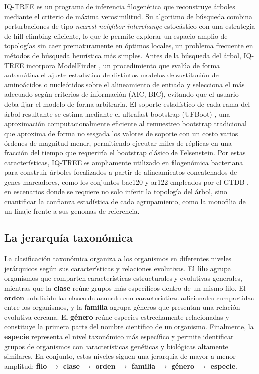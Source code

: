 IQ-TREE \cite{wong2026iqtree3} es un programa de inferencia filogenética que reconstruye árboles mediante el criterio de máxima verosimilitud. Su algoritmo de búsqueda combina perturbaciones de tipo \textit{nearest neighbor interchange} estocástico con una estrategia de hill-climbing eficiente, lo que le permite explorar un espacio amplio de topologías sin caer prematuramente en óptimos locales, un problema frecuente en métodos de búsqueda heurística más simples. Antes de la búsqueda del árbol, IQ-TREE incorpora ModelFinder \cite{kalyaanamoorthy2017modelfinder}, un procedimiento que evalúa de forma automática el ajuste estadístico de distintos modelos de sustitución de aminoácidos o nucleótidos sobre el alineamiento de entrada y selecciona el más adecuado según criterios de información (AIC, BIC), evitando que el usuario deba fijar el modelo de forma arbitraria. El soporte estadístico de cada rama del árbol resultante se estima mediante el ultrafast bootstrap (UFBoot) \cite{hoang2018ufboot}, una aproximación computacionalmente eficiente al remuestreo bootstrap tradicional que aproxima de forma no sesgada los valores de soporte con un costo varios órdenes de magnitud menor, permitiendo ejecutar miles de réplicas en una fracción del tiempo que requeriría el bootstrap clásico de Felsenstein. Por estas características, IQ-TREE es ampliamente utilizado en filogenómica bacteriana para construir árboles focalizados a partir de alineamientos concatenados de genes marcadores, como los conjuntos bac120 y ar122 empleados por el GTDB \cite{gtdbtk2019}, en escenarios donde se requiere no solo inferir la topología del árbol, sino cuantificar la confianza estadística de cada agrupamiento, como la monofilia de un linaje frente a sus genomas de referencia.

\subsection{La jerarquía taxonómica}  

La clasificación taxonómica organiza a los organismos en diferentes niveles jerárquicos según sus características y relaciones evolutivas. El \textbf{filo} agrupa organismos que comparten características estructurales y evolutivas generales, mientras que la \textbf{clase} reúne grupos más específicos dentro de un mismo filo. El \textbf{orden} subdivide las clases de acuerdo con características adicionales compartidas entre los organismos, y la \textbf{familia} agrupa géneros que presentan una relación evolutiva cercana. El \textbf{género} reúne especies estrechamente relacionadas y constituye la primera parte del nombre científico de un organismo. Finalmente, la \textbf{especie} representa el nivel taxonómico más específico y permite identificar grupos de organismos con características genéticas y biológicas altamente similares. En conjunto, estos niveles siguen una jerarquía de mayor a menor amplitud: \textbf{filo $\rightarrow$ clase $\rightarrow$ orden $\rightarrow$ familia $\rightarrow$ género $\rightarrow$ especie}.

